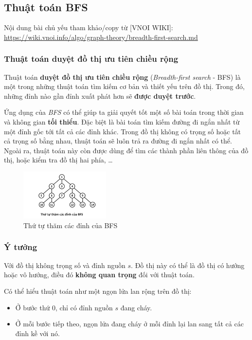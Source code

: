 \documentclass{article}
\begin{document}
\subsection{Thuật toán BFS}

Nội dung bài chủ yếu tham khảo/copy từ [VNOI WIKI]: \url{https://wiki.vnoi.info/algo/graph-theory/breadth-first-search.md}


\subsubsection{Thuật toán duyệt đồ thị ưu tiên chiều rộng}

Thuật toán \textbf{duyệt đồ thị ưu tiên chiều rộng} (\textit{Breadth-first search} - BFS) là một trong những thuật toán tìm kiếm cơ bản và thiết yếu trên đồ thị. Trong đó, những đỉnh nào gần đỉnh xuất phát hơn sẽ \textbf{được duyệt trước}.

Ứng dụng của \textit{BFS} có thể giúp ta giải quyết tốt một số bài toán trong thời gian và không gian \textbf{tối thiểu}. Đặc biệt là bài toán tìm kiếm đường đi ngắn nhất từ một đỉnh gốc tới tất cả các đỉnh khác. Trong đồ thị không có trọng số hoặc tất cả trọng số bằng nhau, thuật toán sẽ luôn trả ra đường đi ngắn nhất có thể. Ngoài ra, thuật toán này còn được dùng để tìm các thành phần liên thông của đồ thị, hoặc kiểm tra đồ thị hai phía, \ldots

\begin{figure}[h]
    \centering
    \includegraphics[width=0.4\textwidth]{img/b6/breadth-first-search_img1.png}
    \caption{Thứ tự thăm các đỉnh của BFS}
\end{figure}

\subsubsection{Ý tưởng}

Với đồ thị không trọng số và đỉnh nguồn $s$. Đồ thị này có thể là đồ thị có hướng hoặc vô hướng, điều đó \textbf{không quan trọng} đối với thuật toán. 

Có thể hiểu thuật toán như một ngọn lửa lan rộng trên đồ thị:

\begin{itemize}
    \item Ở bước thứ $0$, chỉ có đỉnh nguồn $s$ đang cháy.
    \item Ở mỗi bước tiếp theo, ngọn lửa đang cháy ở mỗi đỉnh lại lan sang tất cả các đỉnh kề với nó.
\end{itemize}
\end{document}
